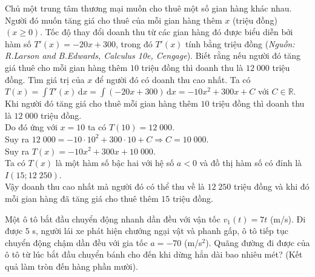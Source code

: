 \begin{ex}%
Chủ một trung tâm thương mại muốn cho thuê một số gian hàng khác nhau. Người đó muốn tăng giá cho thuê của mỗi gian hàng thêm $x$ (triệu đồng) $(x\geqslant0)$. Tốc độ thay đổi doanh thu từ các gian hàng đó được biểu diễn bởi hàm số $T'(x)=-20x+300$, trong đó $T'(x)$ tính bằng triệu đồng (\textit{Nguồn: R.Larson and B.Edwards, Calculus 10e, Cengage}). Biết rằng nếu người đó tăng giá thuê cho mỗi gian hàng thêm $10$ triệu đồng thì doanh thu là $12\;000$ triệu đồng. Tìm giá trị của $x$ để người đó có doanh thu cao nhất.
\loigiai
{
Ta có $T(x)=\displaystyle\int\limits T'(x)\mathrm{\,d}x=\displaystyle\int\limits (-20x+300)\mathrm{\,d}x=-10x^2+300x+C$ với $C\in\mathbb{R}$. \\
Khi người đó tăng giá cho thuê mỗi gian hàng thêm $10$ triệu đồng thì doanh thu là $12\;000$ triệu đồng. \\
Do đó ứng với $x=10$ ta có $T(10)=12\;000$. \\
Suy ra $12\;000=-10\cdot10^2+300\cdot10+C \Rightarrow C=10\;000$. \\
Suy ra $T(x)=-10x^2+300x+10\;000$. \\
Ta có $T(x)$ là một hàm số bậc hai với hệ số $a<0$ và đồ thị hàm số có đỉnh là $I(15;12\;250)$. \\
Vậy doanh thu cao nhất mà người đó có thể thu về là $12\;250$ triệu đồng và khi đó mỗi gian hàng đã tăng giá cho thuê thêm $15$ triệu đồng.
}
\end{ex}

\begin{ex}%
Một ô tô bắt đầu chuyển động nhanh dần đều với vận tốc $v_1(t)=7t$ (m/s). Đi được $5$ s, người lái xe phát hiện chướng ngại vật và phanh gấp, ô tô tiếp tục chuyển động chậm dần đều với gia tốc $a=-70$ (m/s$^2$). Quãng đường đi được của ô tô từ lúc bắt đầu chuyển bánh cho đến khi dừng hẳn dài bao nhiêu mét? (Kết quả làm tròn đến hàng phần mười).
\end{ex}

